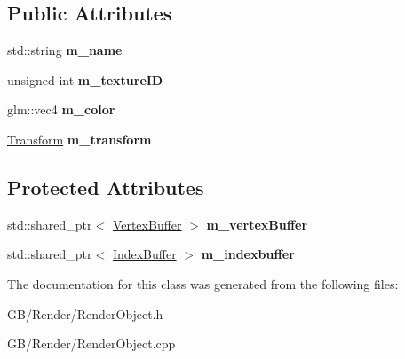 \subsection*{Public Attributes}
\begin{DoxyCompactItemize}
\item 
\mbox{\label{class_g_b_1_1_render_object_ac894adb314de6dc56c39b35095b1262a}} 
std\+::string {\bfseries m\+\_\+name}
\item 
\mbox{\label{class_g_b_1_1_render_object_a14621b5006dbe5600a436cad4bb11fa7}} 
unsigned int {\bfseries m\+\_\+texture\+ID}
\item 
\mbox{\label{class_g_b_1_1_render_object_acad7f28fe263bc1bacced0ea1b576eff}} 
glm\+::vec4 {\bfseries m\+\_\+color}
\item 
\mbox{\label{class_g_b_1_1_render_object_ae062ed0976c2884027940dbf85ef770e}} 
\mbox{\hyperlink{struct_g_b_1_1_transform}{Transform}} {\bfseries m\+\_\+transform}
\end{DoxyCompactItemize}
\subsection*{Protected Attributes}
\begin{DoxyCompactItemize}
\item 
\mbox{\label{class_g_b_1_1_render_object_ae1ca65c3455019874357d599d7d8c620}} 
std\+::shared\+\_\+ptr$<$ \mbox{\hyperlink{class_g_b_1_1_vertex_buffer}{Vertex\+Buffer}} $>$ {\bfseries m\+\_\+vertex\+Buffer}
\item 
\mbox{\label{class_g_b_1_1_render_object_a4a1af1aa0b13929519d5eba9778e5a94}} 
std\+::shared\+\_\+ptr$<$ \mbox{\hyperlink{class_g_b_1_1_index_buffer}{Index\+Buffer}} $>$ {\bfseries m\+\_\+indexbuffer}
\end{DoxyCompactItemize}


The documentation for this class was generated from the following files\+:\begin{DoxyCompactItemize}
\item 
G\+B/\+Render/Render\+Object.\+h\item 
G\+B/\+Render/Render\+Object.\+cpp\end{DoxyCompactItemize}
